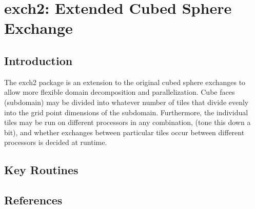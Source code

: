 


\section{exch2: Extended Cubed Sphere Exchange}

\subsection{Introduction}

The exch2 package is an extension to the original cubed sphere exchanges
to allow more flexible domain decomposition and parallelization.  Cube faces
(subdomain) may be divided into whatever number of tiles that divide evenly
into the grid point dimensions of the subdomain.  Furthermore, the individual
tiles may be run on different processors in any combination, (tone this down 
a bit), and whether exchanges between particular tiles occur between different
processors is decided at runtime.







\subsection{Key Routines}



\subsection{References}
